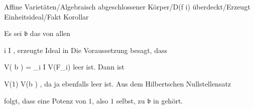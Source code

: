 {Affine Varietäten/Algebraisch abgeschlossener Körper/D(f i) überdeckt/Erzeugt Einheitsideal/Fakt}
{Korollar}
{}
{



\faktsituation {}
\faktzusatz {}
\faktzusatz {}





}
{





Es sei ${\mathfrak b}$ das von allen

 {}
 {i \in I} {}
 {} {} {} {,}
erzeugte Ideal in
 Die Voraussetzung besagt, dass

\mavergleichskettedisp
{\vergleichskette
{ V( {\mathfrak b} )
}
{ =} { \bigcap_{i \in I} V(F_i)
}
{ } {
}
{ } {
}
{ } {
}
}
{}{}{}
 {} {}
leer ist. Dann ist

\mavergleichskette
{\vergleichskette
{ V(1)
}
{ \subseteq }{ V({\mathfrak b} )
}
{  }{
}
{    }{
}
{   }{
}
}
{}{}{,}
da ja
 ebenfalls leer ist. Aus
dem
Hilbertschen Nullstellensatz

folgt, dass eine Potenz von $1$, also $1$ selbst, zu ${\mathfrak b}$ in
 gehört.




}







